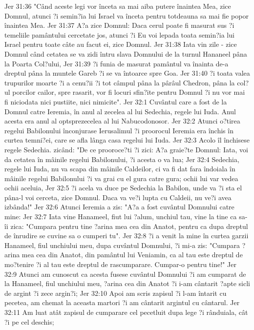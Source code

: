 Jer 31:36  "Când aceste legi vor înceta sa mai aiba putere înaintea Mea, zice Domnul, atunci ?i semin?ia lui Israel va înceta pentru totdeauna sa mai fie popor înaintea Mea.
Jer 31:37  A?a zice Domnul: Daca cerul poate fi masurat sus ?i temeliile pamântului cercetate jos, atunci ?i Eu voi lepada toata semin?ia lui Israel pentru toate câte au facut ei, zice Domnul.
Jer 31:38  Iata vin zile - zice Domnul când cetatea se va zidi întru slava Domnului de la turnul Hananeel pâna la Poarta Col?ului,
Jer 31:39  ?i funia de masurat pamântul va înainta de-a dreptul pâna la muntele Gareb ?i se va întoarce spre Goa.
Jer 31:40  ?i toata valea trupurilor moarte ?i a cenu?ii ?i tot câmpul pâna la pârâul Chedron, pâna la col?ul porcilor cailor, spre rasarit, vor fi locuri sfin?ite pentru Domnul ?i nu vor mai fi niciodata nici pustiite, nici nimicite".
Jer 32:1  Cuvântul care a fost de la Domnul catre Ieremia, în anul al zecelea al lui Sedechia, regele lui Iuda. Anul acesta era anul al optsprezecelea al lui Nabucodonosor.
Jer 32:2  Atunci o?tirea regelui Babilonului înconjurase Ierusalimul ?i proorocul Ieremia era închis în curtea temni?ei, care se afla lânga casa regelui lui Iuda.
Jer 32:3  Acolo îl închisese regele Sedechia. zicând: "De ce prooroce?ti ?i zici: A?a graie?te Domnul: Iata, voi da cetatea în mâinile regelui Babilonului, ?i acesta o va lua;
Jer 32:4  Sedechia, regele lui Iuda, nu va scapa din mâinile Caldeilor, ci va fi dat fara îndoiala în mâinile regelui Babilonului ?i va grai cu el gura catre gura; ochii lui var vedea ochii aceluia,
Jer 32:5  ?i acela va duce pe Sedechia la Babilon, unde va ?i sta el pâna-l voi cerceta, zice Domnul. Daca va ve?i lupta cu Caldeii, nu ve?i avea izbânda!"
Jer 32:6  Atunci Ieremia a zis: "A?a a fost cuvântul Domnului catre mine:
Jer 32:7  Iata vine Hanameel, fiut lui ?alum, unchiul tau, vine la tine ca sa-îi zica: "Cumpara pentru tine ?arina mea cea din Anatot, pentru ca dupa dreptul de înrudire se cuvine sa o cumperi tu".
Jer 32:8  ?i a venit la mine în curtea garzii Hanameel, fiul unchiului meu, dupa cuvântul Domnului, ?i mi-a zis: "Cumpara ?arina mea cea din Anatot, din pamântul lui Veniamin, ca al tau este dreptul de mo?tenire ?i al tau este dreptul de rascumparare. Cumpar-o pentru tine!"
Jer 32:9  Atunci am cunoscut ca acesta fusese cuvântul Domnului ?i am cumparat de la Hanameel, fiul unchiului meu, ?arina cea din Anatot ?i i-am cântarit ?apte sicli de argint ?i zece argin?i;
Jer 32:10  Apoi am scris zapisul ?i l-am întarit cu pecetea, am chemat la aceasta martori ?i am cântarit argintul cu cântarul.
Jer 32:11  Am luat atât zapisul de cumparare cel pecetluit dupa lege ?i rânduiala, cât ?i pe cel deschis;
